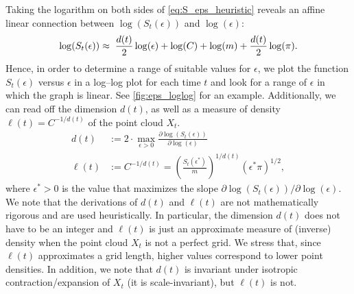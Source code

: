 Taking the logarithm on both sides of \cref{eq:S_eps_heuristic} reveals an affine linear connection between $\log(S_t(\epsilon))$ and $\log(\epsilon)$:
\begin{equation}\label{eq:loglog_relation}
    \log(S_t(\epsilon)) \approx \hspace{1mm} \frac{d(t)}{2}\log(\epsilon) + \log(C) + \log(m) + \frac{d(t)}{2} \log(\pi).
\end{equation}
Hence, in order to determine a range of suitable values for $\epsilon$, we plot the function $S_{t}(\epsilon)$ versus $\epsilon$ in a log--log plot for each time $t$ and look for a range of $\epsilon$ in which the graph is linear. See \cref{fig:eps_loglog} for an example. Additionally, we can read off the dimension $d(t)$, as well as a measure of density $\ell(t) = C^{-1/d(t)}$ of the point cloud $X_t$.
\begin{align}
    d(t)     & := 2 \cdot \max_{\epsilon > 0} \frac{\partial \log (S_t(\epsilon))}{\partial \log (\epsilon)}\label{eq:d_heuristic} \\
    \ell (t) & :=  C^{-1/d(t)} \label{eq:ell_heuristic} =  \left(\frac{S_t(\epsilon^*)}{m}\right)^{1/d(t)}(\epsilon^* \pi)^{1/2},
\end{align}
where $\epsilon^*>0$ is the value that maximizes the slope $\partial \log (S_t(\epsilon)) / \partial \log (\epsilon)$. We note that the derivations of $d(t)$ and $\ell(t)$ are not mathematically rigorous and are used heuristically. In particular, the dimension $d(t)$ does not have to be an integer and $\ell(t)$ is just an approximate measure of (inverse) density when the point cloud $X_t$ is not a perfect grid. We stress that, since $\ell(t)$ approximates a grid length, higher values correspond to lower point densities. In addition, we note that $d(t)$ is invariant under isotropic contraction/expansion of $X_t$ (it is scale-invariant), but $\ell(t)$ is not.

